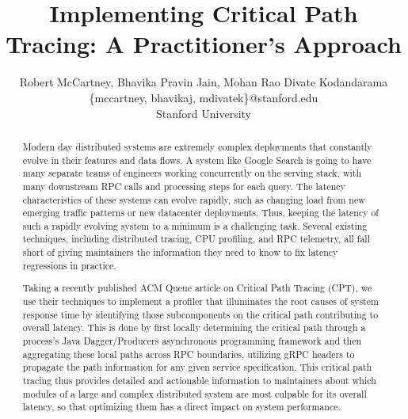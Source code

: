 \documentclass[11pt, twoside, twocolumn]{extarticle}
\title{\textbf{Implementing Critical Path Tracing: A Practitioner’s Approach}}
\date{}
\author{Robert McCartney, Bhavika Pravin Jain, Mohan Rao Divate Kodandarama\\
\small{\{mccartney, bhavikaj, mdivatek\}@stanford.edu} \\
Stanford University}
\begin{document}
\maketitle

\begin{abstract}
Modern day distributed systems are extremely complex deployments that constantly evolve in their features and data flows. A system like Google Search is going to have many separate teams of engineers working concurrently on the serving stack, with many downstream RPC calls and processing steps for each query. The latency characteristics of these systems can evolve rapidly, such as changing load from new emerging traffic patterns or new datacenter deployments.  Thus, keeping the latency of such a rapidly evolving system to a minimum is a challenging task.  Several existing techniques, including distributed tracing, CPU profiling, and RPC telemetry, all fall short of giving maintainers the information they need to know to fix latency regressions in practice.  

Taking a recently published ACM Queue article on Critical Path Tracing\cite{10.1145/3526967} (CPT), we use their techniques to implement a profiler that illuminates the root causes of system response time by identifying those subcomponents on the critical path contributing to overall latency.  This is done by first locally determining the critical path through a process's Java Dagger/Producers asynchronous programming framework and then aggregating these local paths across RPC boundaries, utilizing gRPC headers to propagate the path information for any given service specification.  This critical path tracing thus provides detailed and actionable information to maintainers about which modules of a large and complex distributed system are most culpable for its overall latency, so that optimizing them has a direct impact on system performance.

\end{abstract}
\end{document}
